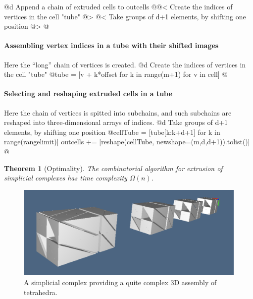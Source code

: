 \documentclass[11pt,oneside]{article}	%
\newtheorem{theorem}{Theorem}
\begin{document}
@d Append a chain of extruded cells to outcells
@{@< Create the indices of vertices in the cell "tube" @>
@< Take groups of d+1 elements, by shifting one position @>	
@}

\paragraph{Assembling vertex indices in a tube with their shifted images}
Here the ``long'' chain of vertices is created.
@d Create the indices of vertices in the cell "tube"
@{tube = [v + k*offset for k in range(m+1) for v in cell]	@}

\paragraph{Selecting and reshaping extruded cells in a tube}
Here the chain of vertices is spitted into subchains, and such subchains are reshaped into three-dimensional arrays of indices.
@d Take groups of d+1 elements, by shifting one position
@{cellTube = [tube[k:k+d+1] for k in range(rangelimit)]
outcells += [reshape(cellTube, newshape=(m,d,d+1)).tolist()]	@}





\begin{theorem}[Optimality]
The combinatorial algorithm for extrusion of simplicial complexes has time complexity $\Omega(n)$.
\end{theorem}

\begin{figure}[htbp] %
   \centering
   \includegraphics[width=0.7\linewidth]{images/assembly} 
   \caption{A simplicial complex providing a quite complex 3D assembly of tetrahedra.}
   \label{fig:example}
\end{figure}
\end{document}
